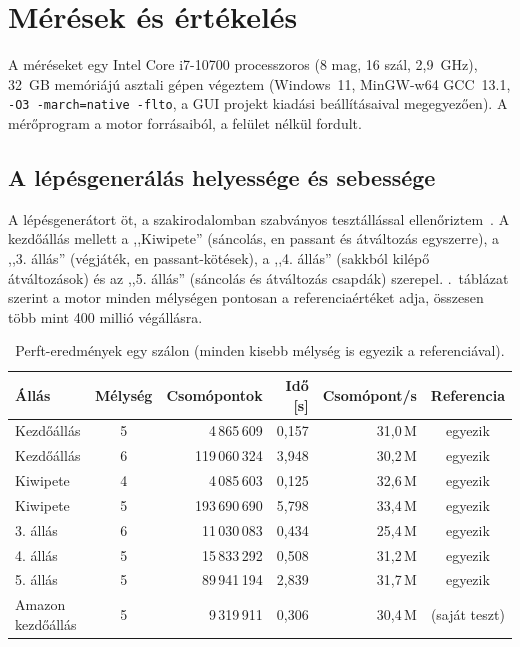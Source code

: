 \chapter{Mérések és értékelés}\label{chap:measurements}

A méréseket egy Intel Core i7-10700 processzoros (8 mag, 16 szál, 2,9~GHz), 32~GB memóriájú asztali gépen végeztem (Windows~11, MinGW-w64 GCC~13.1, \texttt{-O3 -march=native -flto}, a GUI projekt kiadási beállításaival megegyezően). A mérőprogram a motor forrásaiból, a felület nélkül fordult.

\section{A lépésgenerálás helyessége és sebessége}\label{sec:perft}

A lépésgenerátort öt, a szakirodalomban szabványos tesztállással ellenőriztem~\cite{CPWPerft}. A kezdőállás mellett a ,,Kiwipete'' (sáncolás, en passant és átváltozás egyszerre), a ,,3. állás'' (végjáték, en passant-kötések), a ,,4. állás'' (sakkból kilépő átváltozások) és az ,,5. állás'' (sáncolás és átváltozás csapdák) szerepel. .~táblázat szerint a motor minden mélységen pontosan a referenciaértéket adja, összesen több mint 400 millió végállásra.

\begin{table}[!ht]
	\footnotesize
	\centering
	\begin{tabular}{l c r r r c}
		\toprule
		Állás & Mélység & Csomópontok & Idő [s] & Csomópont/s & Referencia \\
		\midrule
		Kezdőállás & 5 & 4\,865\,609 & 0,157 & 31,0\,M & egyezik \\
		Kezdőállás & 6 & 119\,060\,324 & 3,948 & 30,2\,M & egyezik \\
		Kiwipete & 4 & 4\,085\,603 & 0,125 & 32,6\,M & egyezik \\
		Kiwipete & 5 & 193\,690\,690 & 5,798 & 33,4\,M & egyezik \\
		3. állás & 6 & 11\,030\,083 & 0,434 & 25,4\,M & egyezik \\
		4. állás & 5 & 15\,833\,292 & 0,508 & 31,2\,M & egyezik \\
		5. állás & 5 & 89\,941\,194 & 2,839 & 31,7\,M & egyezik \\
		\midrule
		Amazon kezdőállás & 5 & 9\,319\,911 & 0,306 & 30,4\,M & (saját teszt) \\
		\bottomrule
	\end{tabular}
	\caption{Perft-eredmények egy szálon (minden kisebb mélység is egyezik a referenciával).}
	\label{tab:perft}
\end{table}

